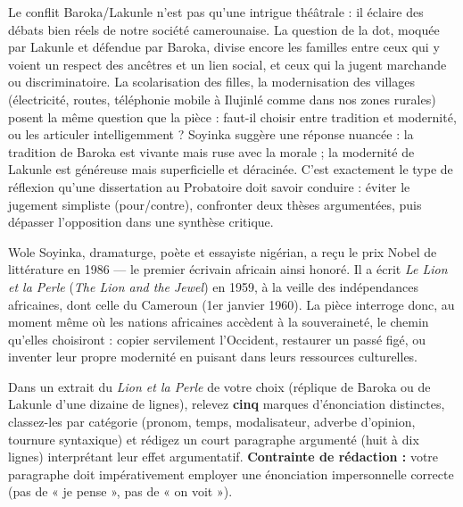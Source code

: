 \documentclass[11pt]{article}
\newcommand{\cle}[1]{{\popxbold\color{popdark}#1}}
\begin{document}
Le conflit Baroka/Lakunle n'est pas qu'une intrigue théâtrale : il éclaire des débats bien réels de notre société camerounaise. La question de la \cle{dot}, moquée par Lakunle et défendue par Baroka, divise encore les familles entre ceux qui y voient un respect des ancêtres et un lien social, et ceux qui la jugent marchande ou discriminatoire. La \cle{scolarisation des filles}, la \cle{modernisation des villages} (électricité, routes, téléphonie mobile à Ilujinlé comme dans nos zones rurales) posent la même question que la pièce : faut-il choisir entre tradition et modernité, ou les articuler intelligemment ? Soyinka suggère une réponse nuancée : la tradition de Baroka est vivante mais ruse avec la morale ; la modernité de Lakunle est généreuse mais superficielle et déracinée. C'est exactement le type de réflexion qu'une dissertation au Probatoire doit savoir conduire : éviter le jugement simpliste (pour/contre), confronter deux thèses argumentées, puis dépasser l'opposition dans une synthèse critique.

\begin{savaistu}
Wole Soyinka, dramaturge, poète et essayiste nigérian, a reçu le prix Nobel de littérature en 1986 — le premier écrivain africain ainsi honoré. Il a écrit \emph{Le Lion et la Perle} (\emph{The Lion and the Jewel}) en 1959, à la veille des indépendances africaines, dont celle du Cameroun (1er janvier 1960). La pièce interroge donc, au moment même où les nations africaines accèdent à la souveraineté, le chemin qu'elles choisiront : copier servilement l'Occident, restaurer un passé figé, ou inventer leur propre modernité en puisant dans leurs ressources culturelles.
\end{savaistu}

\begin{exercice}
Dans un extrait du \emph{Lion et la Perle} de votre choix (réplique de Baroka ou de Lakunle d'une dizaine de lignes), relevez \textbf{cinq} marques d'énonciation distinctes, classez-les par catégorie (pronom, temps, modalisateur, adverbe d'opinion, tournure syntaxique) et rédigez un court paragraphe argumenté (huit à dix lignes) interprétant leur effet argumentatif. \textbf{Contrainte de rédaction :} votre paragraphe doit impérativement employer une énonciation impersonnelle correcte (pas de « je pense », pas de « on voit »).
\end{exercice}
\end{document}
